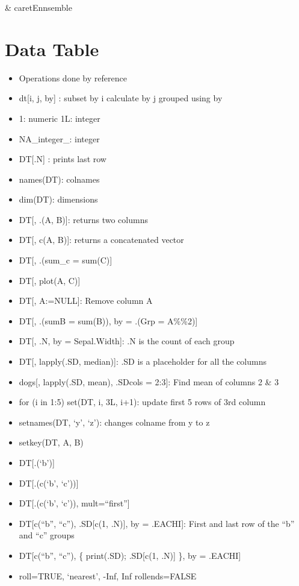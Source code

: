 \documentclass[]{book}
\theoremstyle{definition}
\theoremstyle{definition}
\theoremstyle{definition}
\theoremstyle{remark}
\begin{document}
\& caretEnnsemble

\section{Data Table}\label{data-table}

\begin{itemize}
\item
  Operations done by reference
\item
  dt{[}i, j, by{]} : subset by i calculate by j grouped using by
\item
  1: numeric \textbar{} 1L: integer
\item
  NA\_integer\_: integer
\item
  DT{[}.N{]} : prints last row
\item
  names(DT): colnames
\item
  dim(DT): dimensions
\item
  DT{[}, .(A, B){]}: returns two columns
\item
  DT{[}, c(A, B){]}: returns a concatenated vector
\item
  DT{[}, .(sum\_c = sum(C){]}
\item
  DT{[}, plot(A, C){]}
\item
  DT{[}, A:=NULL{]}: Remove column A
\item
  DT{[}, .(sumB = sum(B)), by = .(Grp = A\%\%2){]}
\item
  DT{[}, .N, by = Sepal.Width{]}: .N is the count of each group
\item
  DT{[}, lapply(.SD, median){]}: .SD is a placeholder for all the
  columns
\item
  dogs{[}, lapply(.SD, mean), .SDcols = 2:3{]}: Find mean of columns 2
  \& 3
\item
  for (i in 1:5) set(DT, i, 3L, i+1): update first 5 rows of 3rd column
\item
  setnames(DT, `y', `z'): changes colname from y to z
\item
  setkey(DT, A, B)
\item
  DT{[}.(`b'){]}
\item
  DT{[}.(c(`b', `c')){]}
\item
  DT{[}.(c(`b', `c')), mult=``first''{]}
\item
  DT{[}c(``b'', ``c''), .SD{[}c(1, .N){]}, by = .EACHI{]}: First and
  last row of the ``b'' and ``c'' groups
\item
  DT{[}c(``b'', ``c''), \{ print(.SD); .SD{[}c(1, .N){]} \}, by =
  .EACHI{]}
\item
  roll=TRUE, `nearest', -Inf, Inf \textbar{} rollends=FALSE
\end{itemize}
\end{document}
